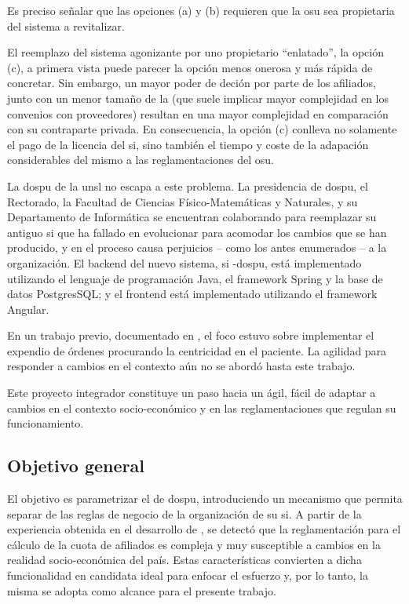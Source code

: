 Es preciso señalar que las opciones (a) y (b) requieren que la \acrshort{osu} sea propietaria del sistema a revitalizar.

El reemplazo del sistema agonizante por uno propietario ``enlatado'', la opción (c), a primera vista puede parecer la opción menos onerosa y más rápida de concretar. 
Sin embargo, un mayor poder de deción por parte de los afiliados, junto con un menor tamaño de la  (que suele implicar mayor complejidad en los convenios con proveedores) resultan en una mayor complejidad en comparación con su contraparte privada. En consecuencia, la opción (c) conlleva no solamente el pago de la licencia del \acrshort{si}, sino también el tiempo y coste de la adapación considerables del mismo a las reglamentaciones del \acrshort{osu}.

La \acrfull{dospu} de la \acrfull{unsl} no escapa a este problema. 
La presidencia de \acrshort{dospu}, el Rectorado, la Facultad de Ciencias Físico-Matemáticas y Naturales, y su Departamento de Informática se encuentran colaborando para reemplazar su antiguo \acrshort{si} que ha fallado en evolucionar para acomodar los cambios que se han producido, y en el proceso causa perjuicios – como los antes enumerados – a la organización. 
%
El backend del nuevo sistema, \acrshort{si} -\acrshort{dospu}, está implementado utilizando el lenguaje de programación Java, el framework Spring y la base de datos PostgresSQL; y el frontend está implementado utilizando el framework Angular. 

En un trabajo previo, documentado en \cite{Vela2024}, el foco estuvo sobre implementar el expendio de órdenes procurando la centricidad en el paciente.
La agilidad para responder a cambios en el contexto aún no se abordó hasta este trabajo.

Este proyecto integrador constituye un paso hacia un {\SIOSU} ágil, fácil de adaptar a cambios en el contexto socio-económico y en las reglamentaciones que regulan su funcionamiento.

\subsection{Objetivo general}

El objetivo es parametrizar el {\SIOSU} de \acrshort{dospu}, introduciendo un mecanismo que permita separar de las reglas de negocio de la organización de su \acrshort{si}. 
A partir de la experiencia obtenida en el desarrollo de {\SIDOSPU}, se detectó que la reglamentación para el cálculo de la cuota de afiliados es compleja y muy susceptible a cambios en la realidad socio-económica del país. 
Estas características convierten a dicha funcionalidad en candidata ideal para enfocar el esfuerzo y, por lo tanto, la misma se adopta como alcance para el presente trabajo.

